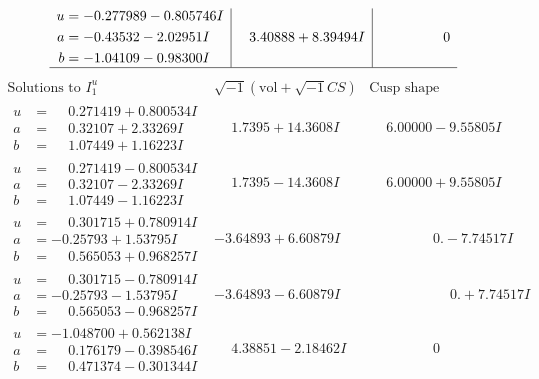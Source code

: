 \documentclass[1p]{elsarticle_modified}
\theoremstyle{definition}
\newcommand{\I}{\sqrt{-1}}
\begin{document}
$$\begin{array}{c|c|c}
\begin{aligned}
u &= -0.277989 - 0.805746 I \\
a &= -0.43532 - 2.02951 I \\
b &= -1.04109 - 0.98300 I\end{aligned}
 & \phantom{-}3.40888 + 8.39494 I & \phantom{-0.000000 } 0\\
 \hline 
 \end{array}$$\newpage$$\begin{array}{c|c|c}  
\text{Solutions to }I^u_{1}& \I (\text{vol} + \sqrt{-1}CS) & \text{Cusp shape}\\
 \hline 
\begin{aligned}
u &= \phantom{-}0.271419 + 0.800534 I \\
a &= \phantom{-}0.32107 + 2.33269 I \\
b &= \phantom{-}1.07449 + 1.16223 I\end{aligned}
 & \phantom{-}1.7395 + 14.3608 I & \phantom{-}6.00000 - 9.55805 I \\ \hline\begin{aligned}
u &= \phantom{-}0.271419 - 0.800534 I \\
a &= \phantom{-}0.32107 - 2.33269 I \\
b &= \phantom{-}1.07449 - 1.16223 I\end{aligned}
 & \phantom{-}1.7395 - 14.3608 I & \phantom{-}6.00000 + 9.55805 I \\ \hline\begin{aligned}
u &= \phantom{-}0.301715 + 0.780914 I \\
a &= -0.25793 + 1.53795 I \\
b &= \phantom{-}0.565053 + 0.968257 I\end{aligned}
 & -3.64893 + 6.60879 I & \phantom{-0.000000 } 0. - 7.74517 I \\ \hline\begin{aligned}
u &= \phantom{-}0.301715 - 0.780914 I \\
a &= -0.25793 - 1.53795 I \\
b &= \phantom{-}0.565053 - 0.968257 I\end{aligned}
 & -3.64893 - 6.60879 I & \phantom{-0.000000 -}0. + 7.74517 I \\ \hline\begin{aligned}
u &= -1.048700 + 0.562138 I \\
a &= \phantom{-}0.176179 - 0.398546 I \\
b &= \phantom{-}0.471374 - 0.301344 I\end{aligned}
 & \phantom{-}4.38851 - 2.18462 I & \phantom{-0.000000 } 0 \\ \hline\begin{aligned}

\end{aligned}
\end{array}$$
\end{document}
